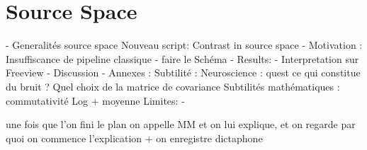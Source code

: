 \section{Source Space}

- Generalités source space
Nouveau script: Contrast in source space
- Motivation : Insuffiscance de pipeline classique
- faire le Schéma
- Results:
- Interpretation sur Freeview
- Discussion
- Annexes : Subtilité :
Neuroscience : quest ce qui constitue du bruit ? Quel choix de la matrice de covariance
Subtilités mathématiques :  commutativité Log + moyenne
Limites:
-





une fois que l'on fini le plan on appelle MM et on lui explique, et on regarde par quoi on commence l'explication +  on enregistre dictaphone